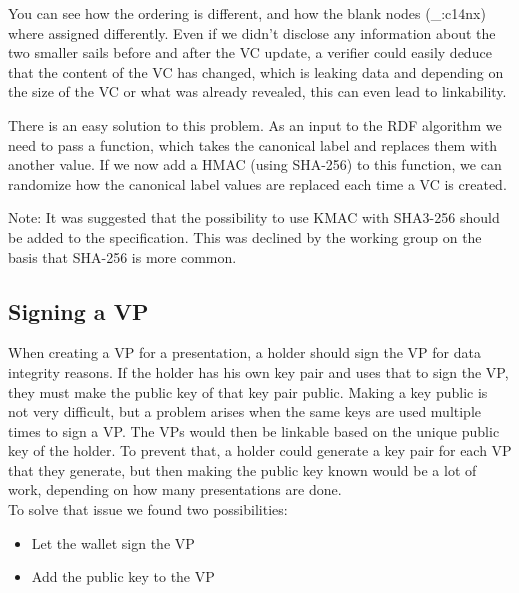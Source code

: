 \documentclass[
	a4paper               %
	,BCOR=0mm            %
	,bibliography=totoc   %
	,listof=totoc         %
	,monolingual
	,twoside=false
]{bfhthesis}              %
\begin{document}
You can see how the ordering is different, and how the blank nodes (\_:c14nx) where assigned differently.
Even if we didn't disclose any information about the two smaller sails before and after the VC update, a verifier could easily deduce that the content of the VC has changed, which is leaking data and depending on the size of the VC or what was already revealed, this can even lead to linkability.

There is an easy solution to this problem.
As an input to the RDF algorithm we need to pass a function, which takes the canonical label and replaces them with another value.
If we now add a HMAC (using SHA-256) to this function, we can randomize how the canonical label values are replaced each time a VC is created.

Note: It was suggested that the possibility to use KMAC with SHA3-256 should be added to the specification. This was declined by the working group on the basis that SHA-256 is more common.

\subsection{Signing a VP}
When creating a VP for a presentation, a holder should sign the VP for data integrity reasons. If the holder has his own key pair and uses that to sign the VP, they must make the public key of that key pair public. Making a key public is not very difficult, but a problem arises when the same keys are used multiple times to sign a VP. The VPs would then be linkable based on the unique public key of the holder. To prevent that, a holder could generate a key pair for each VP that they generate, but then making the public key known would be a lot of work, depending on how many presentations are done.\\
To solve that issue we found two possibilities:
\begin{itemize}
	\item Let the wallet sign the VP
	\item Add the public key to the VP
\end{itemize}
\end{document}
